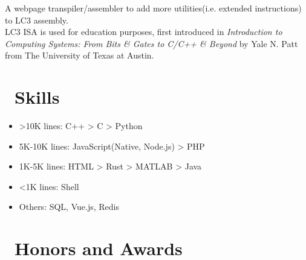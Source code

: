\documentclass{resume}
\begin{document}
A webpage transpiler/assembler to add more utilities(i.e. extended instructions) to LC3 assembly. \\
LC3 ISA is used for education purposes, first introduced in \textit{Introduction to Computing Systems: From Bits \& Gates to C/C++ \& Beyond} 
by Yale N. Patt from The University of Texas at Austin.


\section{\faCogs\ Skills}
\begin{itemize}[parsep=0.5ex]
  \item >10K lines: C++ > C > Python
  \item 5K-10K lines: JavaScript(Native, Node.js) > PHP
  \item 1K-5K lines: HTML > Rust > MATLAB > Java
  \item <1K lines: Shell
  \item Others: SQL, Vue.js, Redis
\end{itemize}

\section{\faHeartO\ Honors and Awards}
\end{document}
